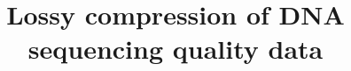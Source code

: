 \documentclass{bmcart}
\begin{document}
\begin{frontmatter}

\begin{fmbox}


\title{Lossy compression of DNA sequencing quality
  data}


\author[
   addressref={aff1,aff2},                   %
   email={chrismh@uw.edu}   %
]{ }
\author[
   addressref={aff4,aff6},
   email={szolek@informatik.uni-tuebingen.de}
]{ }
\author[
   addressref={aff5,aff6},
   email={mohamed.el-hadidi@uni-tuebingen.de}
]{ }
\author[
   addressref={aff3},
   corref={aff2},                       %
   email={mike@umiac.umd.edu}
]{ }



\end{fmbox}
\end{frontmatter}
\end{document}

